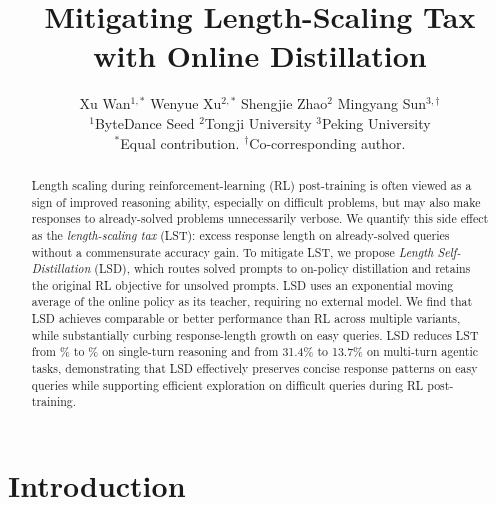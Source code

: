 \documentclass{article} %
\title{Mitigating Length-Scaling Tax with Online Distillation}
\author{
Xu Wan$^{1,*}$ \quad Wenyue Xu$^{2,*}$ \quad Shengjie Zhao$^{2}$ \quad Mingyang Sun$^{3,\dagger}$\\
\normalfont $^1$ByteDance Seed \quad $^2$Tongji University \quad $^3$Peking University\\
\normalfont\small $^*$Equal contribution. \quad $^\dagger$Co-corresponding author.
}
\begin{document}
\maketitle
{}

\begin{abstract}
Length scaling during reinforcement-learning (RL) post-training is often viewed as a sign of improved reasoning ability, especially on difficult problems, but may also make responses to already-solved problems unnecessarily verbose. We quantify this side effect as the \emph{length-scaling tax} (LST): excess response length on already-solved queries without a commensurate accuracy gain. To mitigate LST, we propose \emph{Length Self-Distillation} (LSD), which routes solved prompts to on-policy distillation and retains the original RL objective for unsolved prompts.
LSD uses an exponential moving average of the online policy as its teacher, requiring no external model. We find that LSD achieves comparable or better performance than RL across multiple variants, while substantially curbing response-length growth on easy queries. LSD reduces LST from \mainLSTRLShort\% to \mainLSTFKLShort\% on single-turn reasoning and from 31.4\% to 13.7\% on multi-turn agentic tasks, demonstrating that LSD effectively preserves concise response patterns on easy queries while supporting efficient exploration on difficult queries during RL post-training.

\end{abstract}

\section{Introduction}
\label{sec:introduction}
\end{document}
